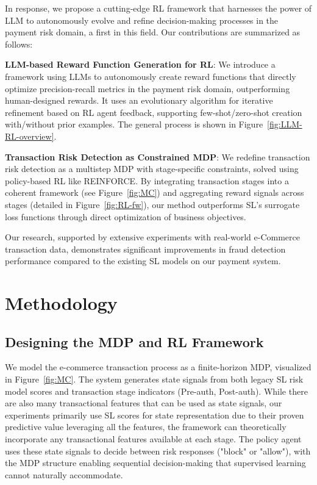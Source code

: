 \documentclass[11pt]{article}
\begin{document}
In response, we propose a cutting-edge RL framework that harnesses the power of LLM to autonomously evolve and refine decision-making processes in the payment risk domain, a first in this field. Our contributions are summarized as follows:

\textbf{LLM-based Reward Function Generation for RL}: We introduce a framework using LLMs to autonomously create reward functions that directly optimize precision-recall metrics in the payment risk domain, outperforming human-designed rewards. It uses an evolutionary algorithm for iterative refinement based on RL agent feedback, supporting few-shot/zero-shot creation with/without prior examples. The general process is shown in Figure~\ref{fig:LLM-RL-overview}.

\textbf{Transaction Risk Detection as Constrained MDP}: We redefine transaction risk detection as a multistep MDP with stage-specific constraints, solved using policy-based RL like REINFORCE. By integrating transaction stages into a coherent framework (see Figure~\ref{fig:MC}) and aggregating reward signals across stages (detailed in Figure~\ref{fig:RL-fw}), our method outperforms SL’s surrogate loss functions through direct optimization of business objectives.

Our research, supported by extensive experiments with real-world e-Commerce transaction data, demonstrates significant improvements in fraud detection performance compared to the existing SL models on our payment system.


\section{Methodology}

\subsection{Designing the MDP and RL Framework}
We model the e-commerce transaction process as a finite-horizon MDP, visualized in Figure~\ref{fig:MC}. The system generates state signals from both legacy SL risk model scores and transaction stage indicators (Pre-auth, Post-auth). While there are also many transactional features that can be used as state signals, our experiments primarily use SL scores for state representation due to their proven predictive value leveraging all the features, the framework can theoretically incorporate any transactional features available at each stage. The policy agent uses these state signals to decide between risk responses ("block" or "allow"), with the MDP structure enabling sequential decision-making that supervised learning cannot naturally accommodate.
\end{document}
